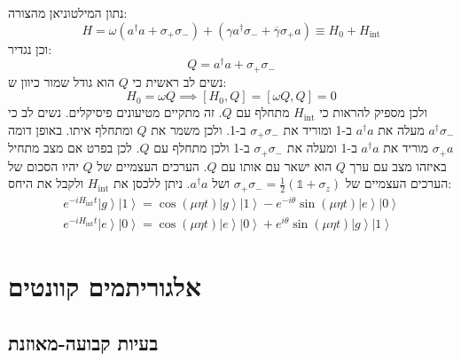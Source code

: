 \documentclass{tstextbook}
\begin{document}
\begin{example}
נתון המילטוניאן מהצורה:
$$H=\omega\left(a^{\dagger}a+\sigma_{+}\sigma_{-}\right)+\left(\gamma a^{\dagger}\sigma_{-}+\overline{{{\gamma}}}\sigma_{+}a\right)\equiv H_{0}+H_{\mathrm{int}}$$
וכן נגדיר:
$$Q=a^{\dagger}a+\sigma_{+}\sigma_{-}$$
נשים לב ראשית כי \(Q\) הוא גודל שמור כיוון ש:
$$H_{0}=\omega Q\implies [H_{0},Q]=\left[ \omega Q,Q \right]=0$$
ולכן מספיק להראות כי \(H_{\text{int}}\) מתחלף עם \(Q\). זה מתקיים מטיעונים פיסיקלים. נשים לב כי \(a^{\dagger}\sigma_{-}\) מעלה את \(a^{\dagger}a\) ב-1 ומוריד את \(\sigma_{+}\sigma_{-}\) ב-1. ולכן משמר את \(Q\) ומתחלף איתו. באופן דומה \(\sigma_{+}a\) מוריד את \(a^{\dagger}a\) ב-1 ומעלה את \(\sigma_{+}\sigma_{-}\) ב-1 ולכן מתחלף עם \(Q\). לכן בפרט אם מצב מתחיל באיזהו מצב עם ערך \(Q\) הוא ישאר עם אותו עם \(Q\).
הערכים העצמיים של \(Q\) יהיו הסכום של הערכים העצמיים של \(\sigma_{+}\sigma_{-}=\frac{1}{2}\left( \mathbb{1}+\sigma_{z} \right)\) ושל \(a^{\dagger}a\).
ניתן ללכסן את \(H_{\text{int}}\) ולקבל את היחס:
\begin{gather*}e^{-i H_{\mathrm{int}}t}\left|g\right\rangle\left|1\right\rangle=\cos\left(\mu\eta t\right)\left|g\right\rangle\left|1\right\rangle-e^{-i\theta}\sin\left(\mu\eta t\right)\left|e\right\rangle\left|0\right\rangle\\ e^{-i H_{\mathrm{int}}t}\left|e\right\rangle\left|0\right\rangle=\cos\left(\mu\eta t\right)\left|e\right\rangle\left|0\right\rangle+e^{i\theta}\sin\left(\mu\eta t\right)\left|g\right\rangle\left|1\right\rangle 
\end{gather*}

\end{example}
\chapter{אלגוריתמים קוונטים}

\section{בעיות קבועה-מאוזנת}
\end{document}
